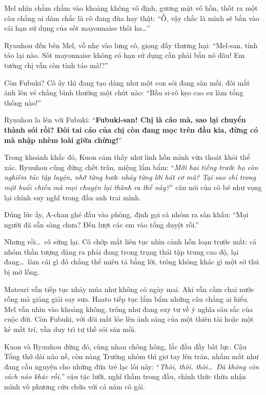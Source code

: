 \documentclass[../main.tex]{subfiles}
\begin{document}
Mel nhìn chằm chằm vào khoảng không vô định, gương mặt vô hồn, thốt ra một câu chẳng ai dám chắc là cô đang đùa hay thật: ``Ồ, vậy chắc là mình sẽ bắn vào cái hạn sử dụng của sốt mayonnaise thôi ha\dots''

Ryuuhou đến bên Mel, vỗ nhẹ vào lưng cô, giọng đầy thương hại: ``Mel-san, tỉnh táo lại nào. Sốt mayonnaise không có hạn sử dụng cần phải bắn nó đâu! Em tưởng chị vẫn còn tỉnh táo mà!?''

Còn Fubuki? Cô ấy thì đang tạo dáng như một con sói đang săn mồi, đôi mắt ánh lên vẻ chẳng bình thường một chút nào: ``Bầu si-rô kẹo cao su làm tổng thống nào!''

Ryuuhou la lên với Fubuki: ``\textbf{Fubuki-san! Chị là cáo mà, sao lại chuyển thành sói rồi? Đôi tai cáo của chị còn đang mọc trên đầu kia, đừng có mà nhập nhèm loài giữa chừng!}''

Trong khoảnh khắc đó, Kuon cảm thấy như linh hồn mình vừa thoát khỏi thể xác. Ryuuhou cũng đứng chết trân, miệng lẩm bẩm: ``\textit{Mới hai tiếng trước họ còn nghiêm túc tập luyện, nhớ từng bước nhảy từng lời hát cơ mà? Tại sao chỉ trong một buổi chiều mà mọi chuyện lại thành ra thế này?}'' câu nói của cô bé như vọng lại chính suy nghĩ trong đầu anh trai mình.

Đúng lúc ấy, A-chan ghé đầu vào phòng, định gọi cả nhóm ra sân khấu: ``Mọi người đã sẵn sàng chưa? Đến lượt các em vào tổng duyệt rồi.''

Nhưng rồi\dots\ cô sững lại. Cô chớp mắt liên tục nhìn cảnh hỗn loạn trước mắt: cả nhóm thần tượng đáng ra phải đang trong trạng thái tập trung cao độ, lại đang\dots\ làm cái gì đó chẳng thể miêu tả bằng lời, trông không khác gì một sở thú bị mở lồng.


Matsuri vẫn tiếp tục nhảy múa như không có ngày mai. Aki vẫn cầm chai nước rỗng mà giảng giải say sưa. Haato tiếp tục lẩm bẩm những câu chẳng ai hiểu. Mel vẫn nhìn vào khoảng không, trông như đang suy tư về ý nghĩa sâu sắc của cuộc đời. Còn Fubuki, với đôi mắt lóe lên ánh sáng của một thiên tài hoặc một kẻ mất trí, vẫn duy trì tư thế sói săn mồi.

Kuon và Ryuuhou đứng đó, cùng nhau chống hông, lắc đầu đầy bất lực. Cậu Tổng thở dài não nề, còn nàng Trưởng nhóm thì giơ tay lên trán, nhắm mắt như đang cầu nguyện cho những đứa trẻ lạc lối này: ``\textit{Thôi, thôi, thôi\dots\ Đã không còn cách nào khác rồi,}'' cậu tặc lưỡi, nghĩ thầm trong đầu, chính thức thừa nhận mình vô phương cứu chữa với cả năm cô gái.
\end{document}
